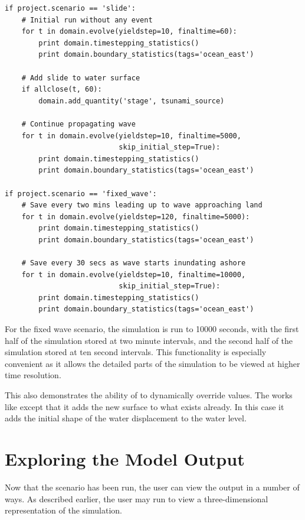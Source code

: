 \documentclass{manual}
\begin{document}
\begin{verbatim}
if project.scenario == 'slide':
    # Initial run without any event
    for t in domain.evolve(yieldstep=10, finaltime=60):
        print domain.timestepping_statistics()
        print domain.boundary_statistics(tags='ocean_east')

    # Add slide to water surface
    if allclose(t, 60):
        domain.add_quantity('stage', tsunami_source)

    # Continue propagating wave
    for t in domain.evolve(yieldstep=10, finaltime=5000,
                           skip_initial_step=True):
        print domain.timestepping_statistics()
        print domain.boundary_statistics(tags='ocean_east')

if project.scenario == 'fixed_wave':
    # Save every two mins leading up to wave approaching land
    for t in domain.evolve(yieldstep=120, finaltime=5000):
        print domain.timestepping_statistics()
        print domain.boundary_statistics(tags='ocean_east')

    # Save every 30 secs as wave starts inundating ashore
    for t in domain.evolve(yieldstep=10, finaltime=10000,
                           skip_initial_step=True):
        print domain.timestepping_statistics()
        print domain.boundary_statistics(tags='ocean_east')
\end{verbatim}

For the fixed wave scenario, the simulation is run to 10000 seconds,
with the first half of the simulation stored at two minute intervals,
and the second half of the simulation stored at ten second intervals.
This functionality is especially convenient as it allows the detailed
parts of the simulation to be viewed at higher time resolution.

This also demonstrates the ability of \anuga to dynamically override values.  The
 works like  except that it adds the new
surface to what exists already.  In this case it adds the initial shape of the water
displacement to the water level.

\section{Exploring the Model Output}

Now that the scenario has been run, the user can view the output in a number of ways.
As described earlier, the user may run  to view a three-dimensional representation
of the simulation.
\end{document}
